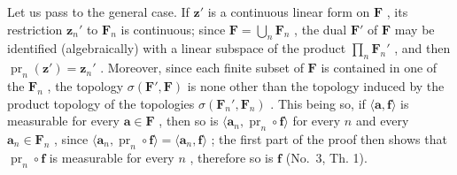 Let us pass to the general case. If \(\mathbf{z}'\) is a continuous linear form on \(\mathbf{F}\) , its restriction \(\mathbf{z}_n'\) to \(\mathbf{F}_n\) is continuous; since \(\mathbf{F} = \bigcup_{n} \mathbf{F}_n\) , the dual \(\mathbf{F}'\) of \(\mathbf{F}\) may be identified (algebraically) with a linear subspace of the product \(\prod_{n} \mathbf{F}_n'\) , and then \(\operatorname{pr}_n(\mathbf{z}') = \mathbf{z}_n'\) . Moreover, since each finite subset of \(\mathbf{F}\) is contained in one of the \(\mathbf{F}_n\) , the topology \(\sigma(\mathbf{F}', \mathbf{F})\) is none other than the topology induced by the product topology of the topologies \(\sigma(\mathbf{F}_n', \mathbf{F}_n)\) . This being so, if \(\langle \mathbf{a}, \mathbf{f} \rangle\) is measurable for every \(\mathbf{a} \in \mathbf{F}\) , then so is \(\langle \mathbf{a}_n, \operatorname{pr}_n \circ \mathbf{f} \rangle\) for every \(n\) and every \(\mathbf{a}_n \in \mathbf{F}_n\) , since \(\langle \mathbf{a}_n, \operatorname{pr}_n \circ \mathbf{f} \rangle = \langle \mathbf{a}_n, \mathbf{f} \rangle\) ; the first part of the proof then shows that \(\operatorname{pr}_n \circ \mathbf{f}\) is measurable for every \(n\) , therefore so is \(\mathbf{f}\) (No.~3, Th. 1).

